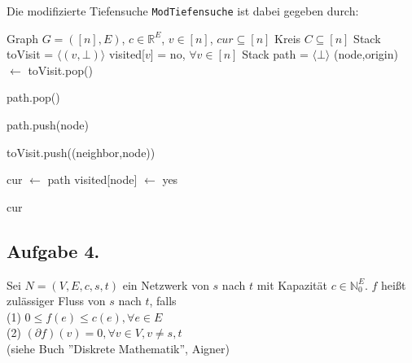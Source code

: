 \documentclass[11pt,a4paper,ngerman]{article}
\begin{document}
Die modifizierte Tiefensuche \texttt{ModTiefensuche} ist dabei gegeben durch: \\

\begin{algorithmic}[1]
\Require Graph $G = ([n],E)$, $c \in \mathbb{R}^E$, $v \in [n]$, $cur \subseteq [n]$
\Ensure Kreis $C \subseteq [n]$
\State Stack toVisit = $\langle (v, \bot) \rangle$
\State visited[$v$] = no, $\forall v \in [n]$
\State Stack path = $\langle \bot \rangle$
\State (node,origin) $\gets$ toVisit.pop()

\State path.pop()
\EndWhile

\State path.push(node)

\State toVisit.push((neighbor,node))
\EndFor

\State cur $\gets$ path
\EndIf
\Else
\State visited[node] $\gets$ yes
\EndIf


\EndWhile
\State \Return cur
\end{algorithmic}

\subsection*{Aufgabe 4.}
Sei $N = (V,E,c,s,t)$ ein Netzwerk von $s$ nach $t$ mit Kapazität $c \in \mathbb{N}_0^E$.
$f$ heißt zulässiger Fluss von $s$ nach $t$, falls \\
(1) $0 \leq f(e) \leq c(e), \forall e \in E$ \\
(2) $(\partial f)(v) = 0, \forall v \in V, v \neq s, t$ \\
(siehe Buch ''Diskrete Mathematik'', Aigner) \\
\end{document}
